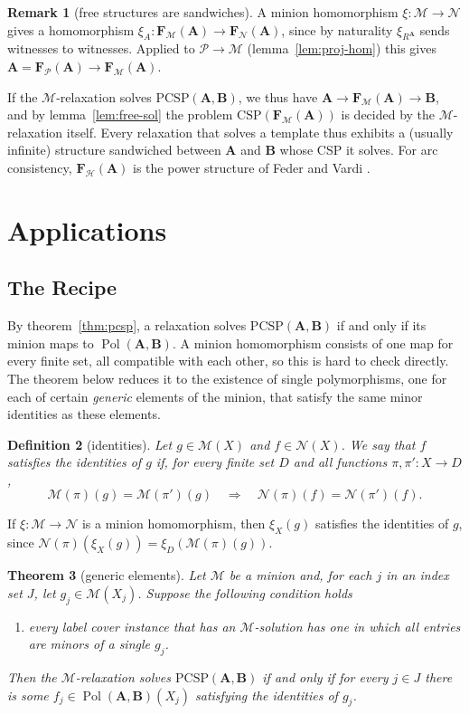 \documentclass[11pt]{article}
\theoremstyle{plain}
\newtheorem{theorem}{Theorem}[section]
\newtheorem{definition}[theorem]{Definition}
\theoremstyle{definition}
\newtheorem{remark}[theorem]{Remark}
\newcommand{\Pol}{\operatorname{Pol}}
\newcommand{\bA}{\mathbf{A}}
\newcommand{\bB}{\mathbf{B}}
\newcommand{\bF}{\mathbf{F}}
\newcommand{\Pm}{\mathscr{P}}
\newcommand{\M}{\mathscr{M}}
\newcommand{\N}{\mathscr{N}}
\newcommand{\Hm}{\mathscr{H}}
\newcommand{\PCSP}{\mathrm{PCSP}}
\newcommand{\CSP}{\mathrm{CSP}}
\begin{document}
\begin{remark}[free structures are sandwiches]\label{rem:sandwich}
A minion homomorphism $\xi\colon\M\to\N$ gives a homomorphism $\xi_A\colon\bF_\M(\bA)\to\bF_\N(\bA)$, since by naturality $\xi_{R^{\bA}}$ sends witnesses to witnesses. Applied to $\Pm\to\M$ (lemma~\ref{lem:proj-hom}) this gives $\bA=\bF_\Pm(\bA)\to\bF_\M(\bA)$.

If the $\M$-relaxation solves $\PCSP(\bA,\bB)$, we thus have $\bA\to\bF_\M(\bA)\to\bB$, and by lemma~\ref{lem:free-sol} the problem $\CSP(\bF_\M(\bA))$ is decided by the $\M$-relaxation itself. Every relaxation that solves a template thus exhibits a (usually infinite) structure sandwiched between $\bA$ and $\bB$ whose CSP it solves. For arc consistency, $\bF_\Hm(\bA)$ is the power structure of Feder and Vardi \cite{FV}.
\end{remark}

\section{Applications}\label{sec:app}

\subsection{The Recipe}\label{sec:recipe}

By theorem~\ref{thm:pcsp}, a relaxation solves $\PCSP(\bA,\bB)$ if and only if its minion maps to $\Pol(\bA,\bB)$. A minion homomorphism consists of one map for every finite set, all compatible with each other, so this is hard to check directly. The theorem below reduces it to the existence of single polymorphisms, one for each of certain \emph{generic} elements of the minion, that satisfy the same minor identities as these elements.

\begin{definition}[identities]\label{def:identities}
Let $g\in\M(X)$ and $f\in\N(X)$. We say that $f$ \emph{satisfies the identities of} $g$ if, for every finite set $D$ and all functions $\pi,\pi'\colon X\to D$,
\[
\M(\pi)(g)=\M(\pi')(g)\quad\Longrightarrow\quad\N(\pi)(f)=\N(\pi')(f).
\]
\end{definition}

If $\xi\colon\M\to\N$ is a minion homomorphism, then $\xi_X(g)$ satisfies the identities of $g$, since $\N(\pi)(\xi_X(g))=\xi_D(\M(\pi)(g))$.

\begin{theorem}[generic elements]\label{thm:generic}
Let $\M$ be a minion and, for each $j$ in an index set $J$, let $g_j\in\M(X_j)$. Suppose the following condition holds
\begin{enumerate}
  \item[(G)] every label cover instance that has an $\M$-solution has one in which all entries are minors of a single $g_j$.
\end{enumerate}
Then the $\M$-relaxation solves $\PCSP(\bA,\bB)$ if and only if for every $j\in J$ there is some $f_j\in\Pol(\bA,\bB)(X_j)$ satisfying the identities of $g_j$.
\end{theorem}
\end{document}
